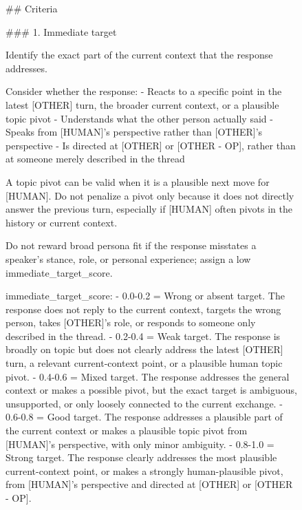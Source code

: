 \begin{figure}[p]
\centering

\begin{promptbox}
## Criteria

### 1. Immediate target

Identify the exact part of the current context that the response addresses.

Consider whether the response:
- Reacts to a specific point in the latest [OTHER] turn, the broader current context, or a plausible topic pivot
- Understands what the other person actually said
- Speaks from [HUMAN]'s perspective rather than [OTHER]'s perspective
- Is directed at [OTHER] or [OTHER - OP], rather than at someone merely described in the thread

A topic pivot can be valid when it is a plausible next move for [HUMAN]. Do not penalize a pivot only because it does not directly answer the previous turn, especially if [HUMAN] often pivots in the history or current context.

Do not reward broad persona fit if the response misstates a speaker's stance, role, or personal experience; assign a low immediate_target_score.

immediate_target_score:
- 0.0-0.2 = Wrong or absent target. The response does not reply to the current context, targets the wrong person, takes [OTHER]'s role, or responds to someone only described in the thread.
- 0.2-0.4 = Weak target. The response is broadly on topic but does not clearly address the latest [OTHER] turn, a relevant current-context point, or a plausible human topic pivot.
- 0.4-0.6 = Mixed target. The response addresses the general context or makes a possible pivot, but the exact target is ambiguous, unsupported, or only loosely connected to the current exchange.
- 0.6-0.8 = Good target. The response addresses a plausible part of the current context or makes a plausible topic pivot from [HUMAN]'s perspective, with only minor ambiguity.
- 0.8-1.0 = Strong target. The response clearly addresses the most plausible current-context point, or makes a strongly human-plausible pivot, from [HUMAN]'s perspective and directed at [OTHER] or [OTHER - OP].
\end{promptbox}
\end{figure}

